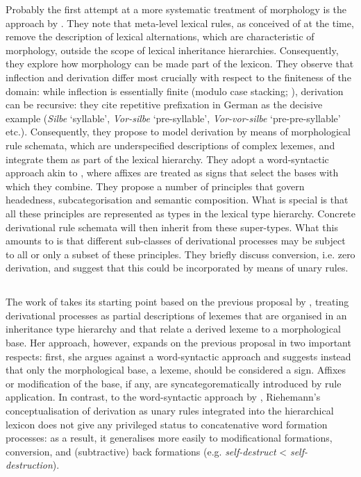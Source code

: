 Probably the first attempt at a more systematic treatment of
morphology is the approach by \citet{Krieger:Nerbonne:93}. They note
that meta-level lexical rules, as conceived of at the time, remove the
description of lexical alternations, which are characteristic of
morphology, outside the scope of lexical inheritance
hierarchies. Consequently, they explore how morphology can be made
part of the lexicon. They observe that inflection and derivation
differ most crucially with respect to the finiteness of the domain:
while inflection is essentially finite (modulo case stacking; \citealp{Sadler06,malouf:head-driven}),
derivation can be recursive: they cite repetitive prefixation in
German as the decisive  example (\textit{Silbe} `syllable',
\textit{Vor-silbe} `pre-syllable', \textit{Vor-vor-silbe}
`pre-pre-syllable' etc.). Consequently, they propose to model
derivation by means of morphological rule schemata, which are
underspecified descriptions of complex lexemes, and integrate
 them as part of the lexical hierarchy. They adopt a
word-syntactic approach akin to \citet{Lieber92}, where affixes are
treated as signs that select the bases with which they combine. They
propose a number of principles that govern headedness,
subcategorisation and semantic composition. What is special is that
all these principles are represented as types in the lexical type
hierarchy. Concrete derivational rule schemata will then inherit from
these super-types. What this amounts to is that different sub-classes
of derivational processes may be subject to all or only a subset of
these principles. They briefly discuss conversion, i.e. zero
derivation, and suggest that this could be incorporated by means of
unary rules. 



\subsection{\protect\citet{Riehemann98}}

The work of \citet{Riehemann98} takes its starting point based on the
previous proposal by \citet{Krieger:Nerbonne:93}, treating
derivational processes as partial descriptions of lexemes that are
organised in an inheritance type hierarchy and that relate a derived
lexeme to a morphological base.  Her approach, however, expands on the
previous proposal in two important respects: first, she argues against
a word-syntactic approach and suggests instead that only the
morphological base, a lexeme, should be considered a sign. Affixes or
modification of the base, if any, are syncategorematically introduced
by rule application. In contrast, to the word-syntactic approach by
\citet{Krieger:Nerbonne:93}, Riehemann's conceptualisation of
derivation as unary rules integrated into the hierarchical lexicon
does not give any privileged status to concatenative word formation
processes: as a result, it generalises more easily to modificational
formations, conversion, and  (subtractive) back formations
(e.g. \textit{self-destruct} < \textit{self-destruction}). 

